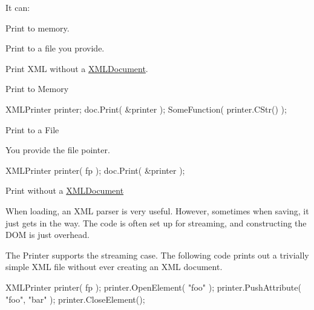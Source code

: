 It can\-:
\begin{DoxyEnumerate}
\item Print to memory.
\item Print to a file you provide.
\item Print X\-M\-L without a \hyperlink{classtinyxml2_1_1_x_m_l_document}{X\-M\-L\-Document}.
\end{DoxyEnumerate}

Print to Memory

\begin{DoxyVerb}XMLPrinter printer;
doc.Print( &printer );
SomeFunction( printer.CStr() );
\end{DoxyVerb}


Print to a File

You provide the file pointer. \begin{DoxyVerb}XMLPrinter printer( fp );
doc.Print( &printer );
\end{DoxyVerb}


Print without a \hyperlink{classtinyxml2_1_1_x_m_l_document}{X\-M\-L\-Document}

When loading, an X\-M\-L parser is very useful. However, sometimes when saving, it just gets in the way. The code is often set up for streaming, and constructing the D\-O\-M is just overhead.

The Printer supports the streaming case. The following code prints out a trivially simple X\-M\-L file without ever creating an X\-M\-L document.

\begin{DoxyVerb}XMLPrinter printer( fp );
printer.OpenElement( "foo" );
printer.PushAttribute( "foo", "bar" );
printer.CloseElement();
\end{DoxyVerb}
 

